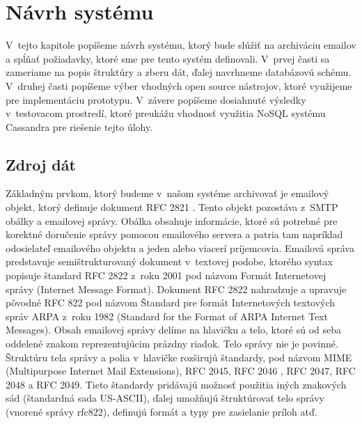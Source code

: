 \documentclass[11pt,twoside,a4paper]{book}
\begin{document}
\chapter{Návrh systému}

V~tejto kapitole popíšeme návrh systému, ktorý bude slúžiť na archiváciu emailov a spĺňať požiadavky, ktoré sme pre tento systém definovali. V~prvej časti sa zameriame na popis štruktúry a zberu dát, ďalej navrhneme databázovú schému. V~druhej časti popíšeme výber vhodných open source nástrojov, ktoré využijeme pre implementáciu prototypu. V~závere popíšeme dosiahnuté výsledky v~testovacom prostredí, ktoré preukážu vhodnosť využitia NoSQL systému Cassandra pre riešenie tejto úlohy.

\section{Zdroj dát}
Základným prvkom, ktorý budeme v~našom systéme archivovať je emailový objekt, ktorý definuje dokument RFC 2821 \cite{Klensin:2001:SMT:RFC2821}. Tento objekt pozostáva z~SMTP obálky a emailovej správy. Obálka obsahuje informácie, ktoré sú potrebné pre korektné doručenie správy pomocou emailového servera a patria tam napríklad odosielateľ emailového objektu a jeden alebo viacerí príjemcovia. Emailová správa predstavuje semištrukturovaný dokument \cite{Udell} v~textovej podobe, ktorého syntax popisuje štandard RFC 2822 \cite{Resnick:2001:IMF:RFC2822} z~roku 2001 pod názvom Formát Internetovej správy (Internet Message Format). Dokument RFC 2822 nahradzuje a upravuje pôvodné RFC 822 pod názvom Štandard pre formát Internetových textových správ ARPA z~roku 1982 (Standard for the Format of ARPA Internet Text Messages). Obsah emailovej správy delíme na hlavičku a telo, ktoré sú od seba oddelené znakom reprezentujúcim prázdny riadok. Telo správy nie je povinné. Štruktúru tela správy a polia v~hlavičke rozširujú štandardy, pod názvom MIME (Multipurpose Internet Mail Extensions), RFC 2045, RFC 2046 \cite{Freed:1996:MIM:RFC2045,Freed:1996:MIM:RFC2046}, RFC 2047, RFC 2048 a RFC 2049. Tieto štandardy pridávajú možnosť použitia iných znakových sád (štandardná sada US-ASCII), ďalej umožňujú štruktúrovať telo správy (vnorené správy rfc822), definujú formát a typy pre zasielanie príloh atď.
\end{document}
